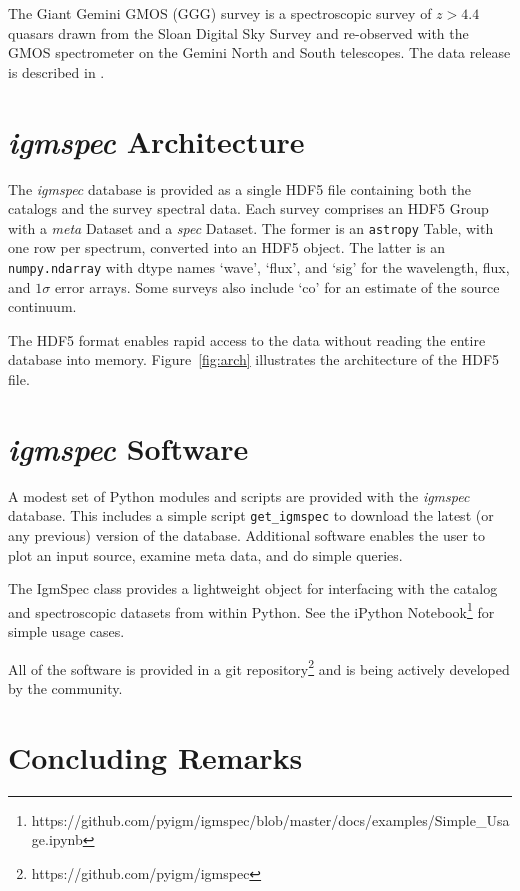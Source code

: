 \documentclass[12pt,preprint]{aastex}
\begin{document}
The Giant Gemini GMOS (GGG) survey is a spectroscopic survey of 
$z>4.4$ quasars drawn from the Sloan Digital Sky Survey and re-observed with the GMOS spectrometer on the Gemini North and South telescopes. 
The data release is described in \cite{worseck+14}.


\section{{\it igmspec} Architecture}
\label{sec:arch}

The {\it igmspec} database is provided as a single HDF5 file
containing both the catalogs and the survey spectral data.  
Each survey comprises an HDF5 Group
with a {\it meta} Dataset and a {\it spec} Dataset.
The former is an {\tt astropy} Table, with one row per
spectrum, converted into an HDF5 object.
The latter is an {\tt numpy.ndarray} 
with dtype names `wave', `flux', and `sig' for the
wavelength, flux, and $1\sigma$ error arrays.
Some surveys also include `co' for an estimate of the source
continuum.  

The HDF5 format enables rapid access to the data without
reading the entire database into memory.  
Figure~\ref{fig:arch} illustrates the 
architecture of the HDF5 file.


\section{{\it igmspec} Software}
\label{sec:software}

A modest set of Python modules and scripts are provided
with the {\it igmspec} database.  This includes a simple
script {\tt get\_igmspec} to download the latest
(or any previous) version of the database.
Additional software enables the user to plot an
input source, examine meta data, and do simple queries.

The IgmSpec class provides a lightweight object for
interfacing with the catalog and spectroscopic datasets
from within Python.  See the iPython Notebook\footnote{
https://github.com/pyigm/igmspec/blob/master/docs/examples/Simple\_Usage.ipynb}
for simple usage cases.

All of the software is provided in a git repository\footnote{
https://github.com/pyigm/igmspec}
and is being actively developed by the community.

\section{Concluding Remarks}
\label{sec:end}
\end{document}
